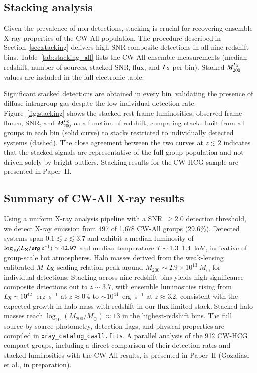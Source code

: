 \documentclass{aa}
\begin{document}
\subsection{Stacking analysis}

Given the prevalence of non-detections, stacking is crucial for recovering ensemble X-ray properties of the CW-All population. The procedure described in Section~\ref{sec:stacking} delivers high-SNR composite detections in all nine redshift bins. Table~\ref{tab:stacking_all} lists the CW-All ensemble measurements (median redshift, number of sources, stacked SNR, flux, and $L_{\rm X}$ per bin). Stacked $M_{200}^{L_{\rm X}}$ values are included in the full electronic table.

Significant stacked detections are obtained in every bin, validating the presence of diffuse intragroup gas despite the low individual detection rate. Figure~\ref{fig:stacking} shows the stacked rest-frame luminosities, observed-frame fluxes, SNR, and $M_{200}^{L_{\rm X}}$ as a function of redshift, comparing stacks built from all groups in each bin (solid curve) to stacks restricted to individually detected systems (dashed). The close agreement between the two curves at $z \lesssim 2$ indicates that the stacked signals are representative of the full group population and not driven solely by bright outliers. Stacking results for the CW-HCG sample are presented in Paper~II.

\subsection{Summary of CW-All X-ray results}

Using a uniform X-ray analysis pipeline with a SNR~$\geq 2.0$ detection threshold, we detect X-ray emission from 497 of 1,678 CW-All groups (29.6\%). Detected systems span $0.1 \lesssim z \lesssim 3.7$ and exhibit a median luminosity of $\log_{10}(L_{\rm X}/\mathrm{erg~s}^{-1}) \approx 42.97$ and median temperature $T \sim 1.3$--1.4~keV, indicative of group-scale hot atmospheres. Halo masses derived from the weak-lensing calibrated $M$--$L_{\rm X}$ scaling relation peak around $M_{200} \sim 2.9 \times 10^{13}~M_{\odot}$ for individual detections. Stacking across nine redshift bins yields high-significance composite detections out to $z \sim 3.7$, with ensemble luminosities rising from $L_{\rm X} \sim 10^{42}$~erg~s$^{-1}$ at $z \approx 0.4$ to $\sim 10^{44}$~erg~s$^{-1}$ at $z \approx 3.2$, consistent with the expected growth in halo mass with redshift in our flux-limited stack. Stacked halo masses reach $\log_{10}(M_{200}/M_{\odot}) \approx 13$ in the highest-redshift bins. The full source-by-source photometry, detection flags, and physical properties are compiled in \texttt{xray\_catalog\_cwall.fits}. A parallel analysis of the 912 CW-HCG compact groups, including a direct comparison of their detection rates and stacked luminosities with the CW-All results, is presented in Paper~II (Gozaliasl et al., in preparation).
\end{document}
